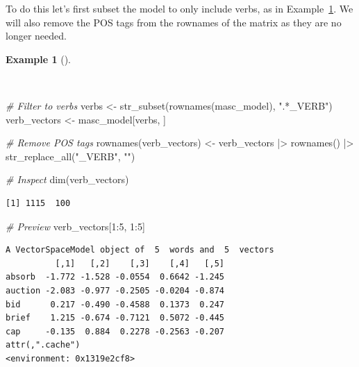 \documentclass[
  letterpaper,
  krantz1]{latex/krantz-mod}
\newenvironment{Shaded}{\begin{snugshade}}{\end{snugshade}}
\newcommand{\CommentTok}[1]{\textcolor[rgb]{0.00,0.00,0.00}{\textit{#1}}}
\newcommand{\DecValTok}[1]{\textcolor[rgb]{0.00,0.00,0.00}{#1}}
\newcommand{\FunctionTok}[1]{\textcolor[rgb]{0.00,0.00,0.00}{#1}}
\newcommand{\NormalTok}[1]{\textcolor[rgb]{0.00,0.00,0.00}{#1}}
\newcommand{\OtherTok}[1]{\textcolor[rgb]{0.00,0.00,0.00}{#1}}
\newcommand{\SpecialCharTok}[1]{\textcolor[rgb]{0.00,0.00,0.00}{#1}}
\newcommand{\StringTok}[1]{\textcolor[rgb]{0.00,0.00,0.00}{#1}}
\theoremstyle{definition}
\newtheorem{example}{Example}[chapter]
\theoremstyle{definition}
\theoremstyle{remark}
\begin{document}
To do this let's first subset the model to only include verbs, as in
Example~\ref{exm-explore-masc-vsm-word2vec-verbs}. We will also remove
the POS tags from the rownames of the matrix as they are no longer
needed.

\begin{example}[]\protect\hypertarget{exm-explore-masc-vsm-word2vec-verbs}{}\label{exm-explore-masc-vsm-word2vec-verbs}

~

\begin{Shaded}
\begin{Highlighting}[numbers=left,,]
\CommentTok{\# Filter to verbs}
\NormalTok{verbs }\OtherTok{\textless{}{-}} \FunctionTok{str\_subset}\NormalTok{(}\FunctionTok{rownames}\NormalTok{(masc\_model), }\StringTok{".*\_VERB"}\NormalTok{)}
\NormalTok{verb\_vectors }\OtherTok{\textless{}{-}}\NormalTok{ masc\_model[verbs, ]}

\CommentTok{\# Remove POS tags}
\FunctionTok{rownames}\NormalTok{(verb\_vectors) }\OtherTok{\textless{}{-}}
\NormalTok{  verb\_vectors }\SpecialCharTok{|\textgreater{}}
  \FunctionTok{rownames}\NormalTok{() }\SpecialCharTok{|\textgreater{}}
  \FunctionTok{str\_replace\_all}\NormalTok{(}\StringTok{"\_VERB"}\NormalTok{, }\StringTok{""}\NormalTok{)}

\CommentTok{\# Inspect}
\FunctionTok{dim}\NormalTok{(verb\_vectors)}
\end{Highlighting}
\end{Shaded}

\begin{verbatim}
[1] 1115  100
\end{verbatim}

\begin{Shaded}
\begin{Highlighting}[numbers=left,,]
\CommentTok{\# Preview}
\NormalTok{verb\_vectors[}\DecValTok{1}\SpecialCharTok{:}\DecValTok{5}\NormalTok{, }\DecValTok{1}\SpecialCharTok{:}\DecValTok{5}\NormalTok{]}
\end{Highlighting}
\end{Shaded}

\begin{verbatim}
A VectorSpaceModel object of  5  words and  5  vectors
          [,1]   [,2]    [,3]    [,4]   [,5]
absorb  -1.772 -1.528 -0.0554  0.6642 -1.245
auction -2.083 -0.977 -0.2505 -0.0204 -0.874
bid      0.217 -0.490 -0.4588  0.1373  0.247
brief    1.215 -0.674 -0.7121  0.5072 -0.445
cap     -0.135  0.884  0.2278 -0.2563 -0.207
attr(,".cache")
<environment: 0x1319e2cf8>
\end{verbatim}

\end{example}
\end{document}

